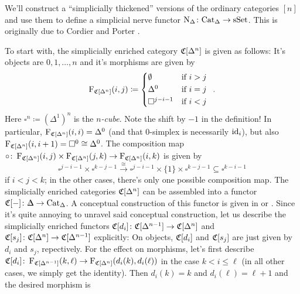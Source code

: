\begin{con}\label{con:SimplicialNerve}
	We'll construct a \enquote{simplicially thickened} versions of the ordinary categories $[n]$ and use them to define a simplicial nerve functor $\operatorname{N}_\Delta\colon\mathrm{Cat}_\Delta\rightarrow\mathrm{sSet}$. This is originally due to Cordier and Porter \cite{CordierPorter}.
	
	To start with, the simplicially enriched category $\mathfrak{C}[\Delta^n]$ is given as follows: It's objects are $0,1,\dotsc,n$ and it's morphisms are given by\label{enum:CDeltan}
	\begin{equation*}
		\F_{\CC[\Delta^n]}(i,j)\coloneqq\begin{cases*}
			\emptyset & if $i>j$\\
			\Delta^0 & if $i=j$\\
			\square^{j-i-1} & if $i<j$
		\end{cases*}\,.
	\end{equation*}
	Here $\square^n\coloneqq (\Delta^1)^n$ is the \emph{$n$-cube}. Note the shift by $-1$ in the definition! In particular, $\operatorname{F}_{\mathfrak{C}[\Delta^n]}(i,i)=\Delta^0$ (and that $0$-simplex is necessarily $\operatorname{id}_i$), but also $\operatorname{F}_{\mathfrak{C}[\Delta^n]}(i,i+1)=\square^0\cong \Delta^0$. The composition map $\circ\colon\operatorname{F}_{\mathfrak{C}[\Delta^n]}(i,j)\times \operatorname{F}_{\mathfrak{C}[\Delta^n]}(j,k)\rightarrow \operatorname{F}_{\mathfrak{C}[\Delta^n]}(i,k)$ is given by
	\begin{equation*}
		\square^{j-i-1}\times\square^{k-j-1}\overset{\cong}{\longrightarrow}\square^{j-i-1}\times\{1\}\times\square^{k-j-1}\subseteq \square^{k-i-1}
	\end{equation*}
	if $i<j<k$; in the other cases, there's only one possible composition map. The simplicially enriched categories $\mathfrak{C}[\Delta^n]$ can be assembled into a functor $\CC[-]\colon\IDelta\rightarrow\cat{Cat}_\Delta$. A conceptual construction of this functor is given in \cite[Definition~]{HTT} or \cite[Lemma~1.2.62]{Land}. Since it's quite annoying to unravel said conceptual construction, let us describe the simplicially enriched functors $\mathfrak{C}[d_i]\colon \mathfrak{C}[\Delta^{n-1}]\rightarrow\mathfrak{C}[\Delta^n]$ and $\mathfrak{C}[s_j]\colon \mathfrak{C}[\Delta^n]\rightarrow\mathfrak{C}[\Delta^{n-1}]$ explicitly: On objects, $\mathfrak{C}[d_i]$ and $\mathfrak{C}[s_j]$ are just given by $d_i$ and $s_j$, repectively. For the effect on morphisms, let's first describe $\mathfrak{C}[d_i]\colon \operatorname{F}_{\mathfrak{C}[\Delta^{n-1}]}(k,\ell)\rightarrow \operatorname{F}_{\mathfrak{C}[\Delta^n]}(d_i(k),d_i(\ell))$ in the case $k<i\leqslant\ell$ (in all other cases, we simply get the identity). Then $d_i(k)=k$ and $d_i(\ell)=\ell+1$ and the desired morphism is\label{enum:CDeltanFunctorial}

\end{con}
